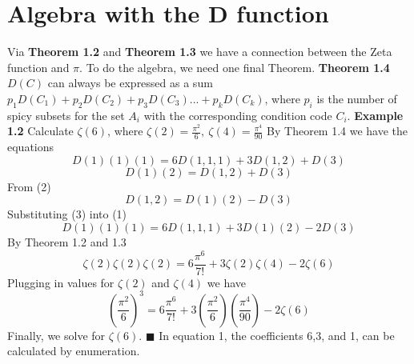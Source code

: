 \documentclass[12pt]{article}
\begin{document}
\section{Algebra with the D function}
Via \textbf{Theorem 1.2} and \textbf{Theorem 1.3} we have a connection between the Zeta function and \(\pi\). To do the algebra, we need one final Theorem. \newline
\textbf{Theorem 1.4} \newline
\(D(C)\) can always be expressed as a sum \(p_1D(C_1)+p_2D(C_2)+p_3D(C_3)...+p_kD(C_k)\), where \(p_i\) is the number of spicy subsets for the set \(A_i\) with the corresponding condition code \(C_i\). \newline
\textbf{Example 1.2} \newline
Calculate \(\zeta(6)\), where \(\zeta(2) = \frac{\pi^2}{6},\ \zeta(4)=\frac{\pi^4}{90}\) \newline
By Theorem 1.4 we have the equations
\begin{equation}
D(1)(1)(1)=6D(1,1,1)+3D(1,2)+D(3)
\end{equation}
\begin{equation}
D(1)(2) = D(1,2) + D(3)
\end{equation}
From (2)
\begin{equation}
D(1,2) = D(1)(2) - D(3)
\end{equation}
Substituting (3) into (1)
\begin{equation}
D(1)(1)(1) = 6D(1,1,1) + 3D(1)(2) - 2D(3)
\end{equation}
By Theorem 1.2 and 1.3
\begin{equation}
\zeta(2)\zeta(2)\zeta(2) = 6\frac{\pi^6}{7!} + 3\zeta(2)\zeta(4) - 2\zeta(6)
\end{equation}
Plugging in values for \(\zeta(2)\) and \(\zeta(4)\) we have
\begin{equation}
\left(\frac{\pi^2}{6}\right)^3 = 6\frac{\pi^6}{7!} + 3\left(\frac{\pi^2}{6}\right)\left(\frac{\pi^4}{90}\right) - 2\zeta(6)
\end{equation}
Finally, we solve for \(\zeta(6)\). \newline
{} \newline \newline
\(\blacksquare\) \newline
In equation 1, the coefficients 6,3, and 1, can be calculated by enumeration.
\end{document}
